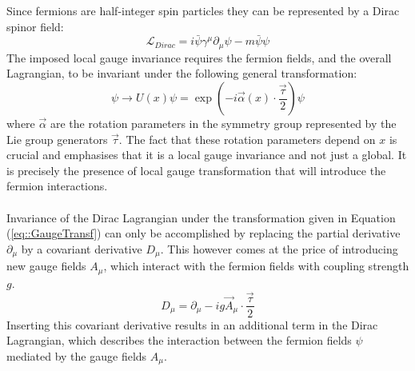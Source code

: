Since fermions are half-integer spin particles they can be represented by a Dirac spinor field:
\begin{equation} \label{eq::DiracL}
 \mathcal{L}_{Dirac} = i \bar{\psi} \gamma^{\mu} \partial_{\mu} \psi - m \bar{\psi} \psi
\end{equation}
The imposed local gauge invariance requires the fermion fields, and the overall Lagrangian, to be invariant under the following general transformation:
\begin{equation} \label{eq::GaugeTransf}
 \psi \rightarrow U(x) \psi =  \exp \left( -i \vec{\alpha}(x) \cdot \frac{\vec{\tau}}{2} \right) \psi
\end{equation}
where $\vec{\alpha}$ are the rotation parameters in the symmetry group represented by the Lie group generators $\vec{\tau}$. The fact that these rotation parameters depend on $x$ is crucial and emphasises that it is a local gauge invariance and not just a global. It is precisely the presence of local gauge transformation that will introduce the fermion interactions.
\\
\\
Invariance of the Dirac Lagrangian under the transformation given in Equation (\ref{eq::GaugeTransf}) can only be accomplished by replacing the partial derivative $\partial_{\mu}$ by a covariant derivative $D_{\mu}$. This however comes at the price of introducing new gauge fields $A_{\mu}$, which interact with the fermion fields with coupling strength $g$.
\begin{equation} \label{eq::CovDer}
 D_{\mu} = \partial_{\mu} -i g \vec{A}_{\mu} \cdot \frac{\vec{\tau}}{2}
\end{equation}
Inserting this covariant derivative results in an additional term in the Dirac Lagrangian, which describes the interaction between the fermion fields $\psi$ mediated by the gauge fields $A_{\mu}$. 
